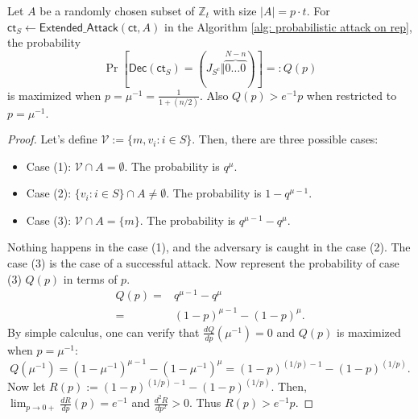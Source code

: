 \documentclass[runningheads]{llncs}
\newcommand{\bb}[1]{\mathbb{#1}}  %
\newcommand{\cc}[1]{\mathcal{#1}} %
\newcommand{\ct}{\textsf{ct}{}}
\begin{document}
            \begin{theorem}\label{thm2: univ}
                Let $A$ be a randomly chosen subset of $\bb Z_t$ with size $|A|=p\cdot t$. For $\ct_S\gets\mathsf{Extended\_Attack}(\ct,A)$ in the Algorithm \ref{alg: probabilistic attack on rep}, the probability $$\Pr\left[\mathsf{Dec}(\ct_S)=(J_{S^c}\Vert\overbrace{0\dots0}^{N-n})\right]=:Q(p)$$ is maximized when $p=\mu^{-1}=\frac{1}{1+(n/2)}$. Also $Q(p)>e^{-1}p$ when restricted to $p=\mu^{-1}.$
            \end{theorem}
            \begin{proof}
                Let's define $\cc V:=\{m,v_i:i\in S\}$. Then, there are three possible cases: 
                    \begin{itemize} 
                        \item Case (1): $\cc V\cap A=\emptyset$. The probability is $q^{\mu}$.
                        \item Case (2): $\{v_i:i\in S\}\cap A\neq\emptyset$. The probability is $1-q^{\mu-1}$. 
                        \item Case (3): $\cc V \cap A=\{m\}$. The probability is $q^{\mu-1}-q^{\mu}$. 
                    \end{itemize}
                Nothing happens in the case (1), and the adversary is caught in the case (2). The case (3) is the case of a successful attack. 
                Now represent the probability of case (3) $Q(p)$ in terms of $p$. 
                \begin{align*}
                    Q(p)=&q^{\mu-1}-q^\mu \\
                    =&(1-p)^{\mu-1}-(1-p)^{\mu}.
                \end{align*} 
            By simple calculus, one can verify that $\frac{dQ}{dp}(\mu^{-1})=0$ and $Q(p)$ is maximized when $p=\mu^{-1}$: $$Q(\mu^{-1})=(1-\mu^{-1})^{\mu-1}-(1-\mu^{-1})^{\mu}=(1-p)^{(1/p)-1}-(1-p)^{(1/p)}.$$
            Now let $R(p):=(1-p)^{(1/p)-1}-(1-p)^{(1/p)}$. Then, $\lim_{p\to 0+}\frac{dR}{dp}(p)=e^{-1}$ and $\frac{d^2R}{dp^2}>0$. Thus 
            $R(p)>e^{-1}p$.
            \end{proof}
\end{document}
